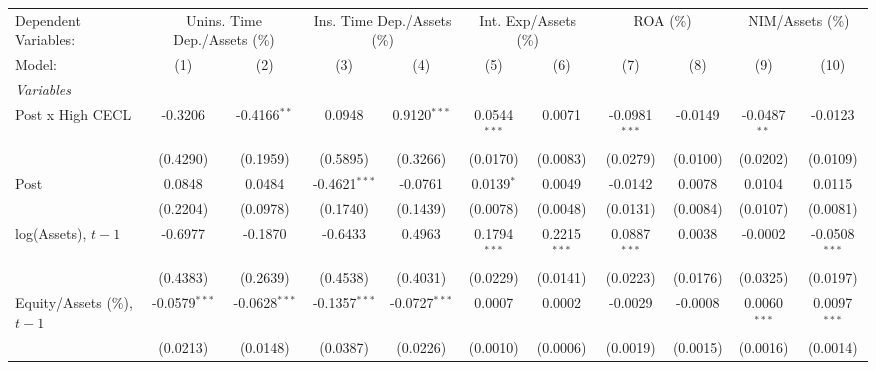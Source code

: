
\begingroup
\centering
\begin{tabular}{lcccccccccc}
   \tabularnewline \midrule \midrule
   Dependent Variables: & \multicolumn{2}{c}{Unins. Time Dep./Assets (\%)} & \multicolumn{2}{c}{Ins. Time Dep./Assets (\%)} & \multicolumn{2}{c}{Int. Exp/Assets (\%)} & \multicolumn{2}{c}{ROA (\%)} & \multicolumn{2}{c}{NIM/Assets (\%)}\\
   Model:                         & (1)             & (2)             & (3)             & (4)             & (5)            & (6)            & (7)             & (8)      & (9)            & (10)\\  
   \midrule
   \emph{Variables}\\
   Post x High CECL               & -0.3206         & -0.4166$^{**}$  & 0.0948          & 0.9120$^{***}$  & 0.0544$^{***}$ & 0.0071         & -0.0981$^{***}$ & -0.0149  & -0.0487$^{**}$ & -0.0123\\   
                                  & (0.4290)        & (0.1959)        & (0.5895)        & (0.3266)        & (0.0170)       & (0.0083)       & (0.0279)        & (0.0100) & (0.0202)       & (0.0109)\\   
   Post                           & 0.0848          & 0.0484          & -0.4621$^{***}$ & -0.0761         & 0.0139$^{*}$   & 0.0049         & -0.0142         & 0.0078   & 0.0104         & 0.0115\\   
                                  & (0.2204)        & (0.0978)        & (0.1740)        & (0.1439)        & (0.0078)       & (0.0048)       & (0.0131)        & (0.0084) & (0.0107)       & (0.0081)\\   
   log(Assets), $t{-}1$           & -0.6977         & -0.1870         & -0.6433         & 0.4963          & 0.1794$^{***}$ & 0.2215$^{***}$ & 0.0887$^{***}$  & 0.0038   & -0.0002        & -0.0508$^{***}$\\   
                                  & (0.4383)        & (0.2639)        & (0.4538)        & (0.4031)        & (0.0229)       & (0.0141)       & (0.0223)        & (0.0176) & (0.0325)       & (0.0197)\\   
   Equity/Assets (\%), $t{-}1$    & -0.0579$^{***}$ & -0.0628$^{***}$ & -0.1357$^{***}$ & -0.0727$^{***}$ & 0.0007         & 0.0002         & -0.0029         & -0.0008  & 0.0060$^{***}$ & 0.0097$^{***}$\\   
                                  & (0.0213)        & (0.0148)        & (0.0387)        & (0.0226)        & (0.0010)       & (0.0006)       & (0.0019)        & (0.0015) & (0.0016)       & (0.0014)\\   

\end{tabular}
